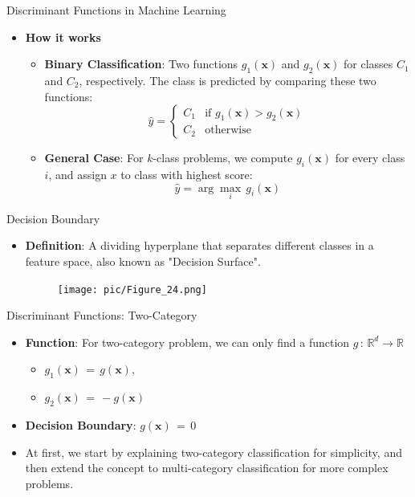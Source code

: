 \documentclass[serif, aspectratio=169]{beamer}
\begin{document}
\begin{frame}{Discriminant Functions in Machine Learning}
    \begin{itemize}
        \item \textbf{How it works}
        \medskip
        \begin{itemize}\itemsep1.5em
            \item \justifying \textbf{Binary Classification}: Two functions \textbf{$g_1(\mathbf{x})$} and \textbf{$g_2(\mathbf{x})$} for classes $C_1$ and $C_2$, respectively. The class is predicted by comparing these two functions:
            \[
                \hat{y} =
                \begin{cases} 
                    C_1 & \text{if } g_1(\mathbf{x}) > g_2(\mathbf{x}) \\
                    C_2 & \text{otherwise}
                \end{cases}
            \]

            \item \justifying \textbf{General Case}: For $k$-class problems, we compute \textbf{$g_i(\mathbf{x})$} for every class $i$, and assign \textbf{$x$} to class with highest score:
            $$
                \hat{y} = \arg \max_i \, g_i(\mathbf{x})
            $$
        \end{itemize}
    \end{itemize}
\end{frame}

\begin{frame}{Decision Boundary}
    \begin{itemize}
        \item \justifying \textbf{Definition}: A dividing hyperplane that separates different classes in a feature space, also known as "Decision Surface".
        \medskip
        \begin{figure}
            \centering
            \texttt{[image: pic/Figure\_24.png]}
        \end{figure}
    \end{itemize}
\end{frame}

\begin{frame}{Discriminant Functions: Two-Category}
    \begin{itemize}\itemsep1.5em
        \item \justifying \textbf{Function}: For two-category problem, we can only find a function $g \, : \, \mathbb{R}^d \rightarrow \mathbb{R}$
        \begin{itemize}
            \item $g_1(\mathbf{x}) \, = \, g(\mathbf{x})$,
            \item $g_2(\mathbf{x}) \, = \, -g(\mathbf{x})$
        \end{itemize}
        \item \textbf{Decision Boundary}: $g(\mathbf{x}) \, = \, 0$
        \item \justifying At first, we start by explaining two-category classification for simplicity, and then extend the concept to multi-category classification for more complex problems.
    \end{itemize}
\end{frame}
\end{document}
